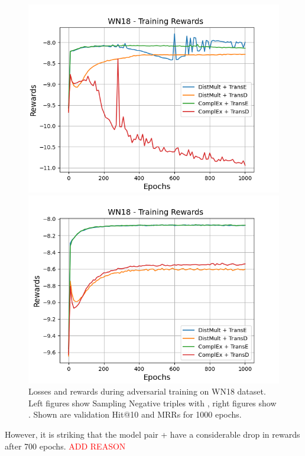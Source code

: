 \begin{figure}
\begin{minipage}{.5\textwidth}
      \centering
      \includegraphics[width=0.9\linewidth]{figures/results/gan_train/not_pretrained/uncertainty/max/entropy/wn18/1k_epochs/uncertainty_wn18_rew.png}
    \end{minipage}%
    \begin{minipage}{.5\textwidth}
      \centering
      \includegraphics[width=0.9\linewidth]{figures/results/gan_train/not_pretrained/uncertainty/max_distribution/entropy/wn18/1k_epochs/uncertainty_wn18_rew.png}
    \end{minipage}%
    \caption{Losses and rewards during adversarial training on \textsc{WN18} dataset. 
    Left figures show Sampling Negative triples with \usmax, right figures show \ussoftmax.
    Shown are validation Hit@10 and MRRs for 1000 epochs.}
    \label{fig:advtrain_wn18_usmax_ussoftmax_losses_rewards}
\end{figure}
However, it is striking that the model pair \dismult + \transd have a considerable drop in rewards after 700 epochs.
\textcolor{red}{ADD REASON}


